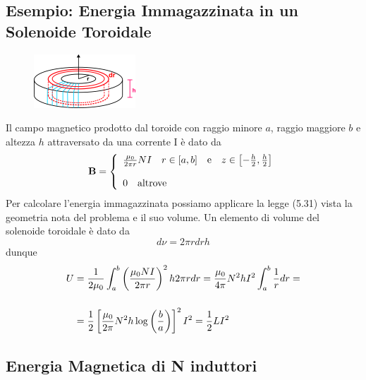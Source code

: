 \subsection{Esempio: Energia Immagazzinata in un Solenoide Toroidale}

\begin{figure} %
    \centering
    \includegraphics[width=0.34\textwidth]{images/toroid1} %
\end{figure}
Il campo magnetico prodotto dal toroide con raggio minore $a$, raggio maggiore $b$ e altezza $h$ attraversato da una corrente I \`e dato da 
\begin{equation*}
	\bold{B} = \left \{ \begin{array}{l}
		\frac{\mu_0}{2 \pi r}NI \quad r \in [a,b] \quad \text{e} \quad z \in \left[ - \frac{h}{2},\frac{h}{2}\right] \\ \rule{0pt}{20pt}
		0 \quad \text{altrove}
	\end{array}	\right.
\end{equation*}
Per calcolare l'energia immagazzinata possiamo applicare la legge (5.31) vista la geometria nota del problema e il suo volume. Un elemento di volume del solenoide toroidale \`e dato da 
\begin{equation*}
	d \nu = 2 \pi rdr h
\end{equation*}
dunque 
\begin{align*}
	U & = \frac{1}{2 \mu_0}\int_{a}^{b} \left(\frac{\mu_0 NI}{2 \pi r}\right)^2h 2\pi rdr  = \frac{\mu_0}{4 \pi} N^2 hI^2 \int_{a}^{b} \frac{1}{r}dr = \\ \rule{0pt}{30pt} & =\frac{1}{2} \left[\frac{\mu_0}{2 \pi }N^2 h \log\left(\frac{b}{a}\right)\right]^2I^2 =  \frac{1}{2}LI^2
\end{align*}

\subsection{Energia Magnetica di N induttori}

